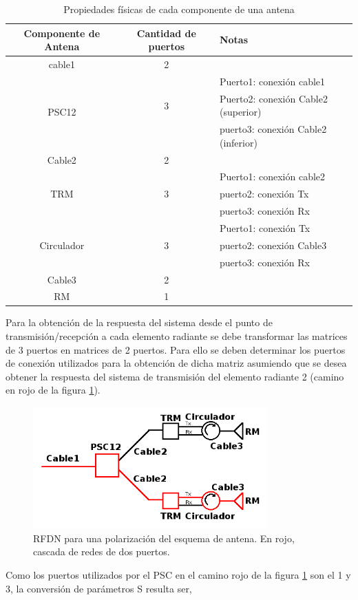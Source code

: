 \begin{table}[H]
  \footnotesize
  \centering
  \begin{tabular}{|c|c|p{6cm}|}
	\hline
	\textbf{Componente de Antena} & \textbf{Cantidad de puertos} & \textbf{Notas} \tabularnewline \hline
	cable1 &  2 & \tabularnewline \hline
	\multirow{3}{*}{PSC12} & & Puerto1: conexión cable1 \tabularnewline
	 & 3 & Puerto2: conexión Cable2 (superior) \tabularnewline
	 & & puerto3: conexión Cable2 (inferior) \tabularnewline \hline
	Cable2 & 2 & \tabularnewline \hline
	\multirow{3}{*}{TRM} & & Puerto1: conexión cable2 \tabularnewline
	 & 3 & puerto2: conexión Tx \tabularnewline
	 & & puerto3: conexión Rx \tabularnewline \hline
	\multirow{3}{*}{Circulador} & & Puerto1: conexión Tx \tabularnewline
	 & 3 & puerto2: conexión Cable3 \tabularnewline
	 & & puerto3: conexión Rx \tabularnewline \hline
	Cable3 & 2 & \tabularnewline \hline
	RM & 1 & \tabularnewline \hline
  \end{tabular}
  \caption{Propiedades físicas de cada componente de una antena}
  \label{tab:componentSParameters}
\end{table}

Para la obtención de la respuesta del sistema desde el punto de transmisión/recepción a cada elemento radiante se debe
transformar las matrices de 3 puertos en matrices de 2 puertos. Para ello se deben determinar los puertos de conexión utilizados
para la obtención de dicha matriz asumiendo que se desea obtener la respuesta del sistema de transmisión del elemento radiante
2 (camino en rojo de la figura \ref{fig:antennaSLoop}).

\begin{figure}[H]
 \centering
 \includegraphics[width=9cm]{gfx/RFDNLoop.png}
 \caption{RFDN para una polarización del esquema de antena. En rojo, cascada de redes de dos puertos.}
 \label{fig:antennaSLoop}
\end{figure}

Como los puertos utilizados por el PSC en el camino rojo de la figura \ref{fig:antennaSLoop} son el 1 y 3, la conversión de
parámetros S resulta ser,

